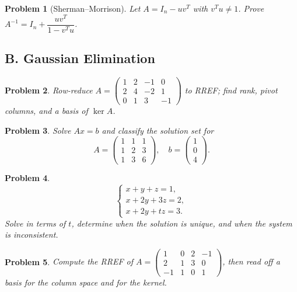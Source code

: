 \documentclass[11pt]{article}
\theoremstyle{upright}
\newtheorem{problem}{Problem}
\begin{document}
\begin{problem}[Sherman--Morrison]
Let $A=I_n-uv^T$ with $v^Tu\neq 1$. Prove $A^{-1}=I_n+\dfrac{uv^T}{1-v^Tu}$.
\end{problem}

\subsection*{B. Gaussian Elimination}
\begin{problem}
Row-reduce $A=\begin{pmatrix}1&2&-1&0\\ 2&4&-2&1\\ 0&1&3&-1\end{pmatrix}$ to RREF; find rank, pivot columns, and a basis of $\ker A$.
\end{problem}

\begin{problem}
Solve $Ax=b$ and classify the solution set for
\[
A=\begin{pmatrix}1&1&1\\ 1&2&3\\ 1&3&6\end{pmatrix},\quad
b=\begin{pmatrix}1\\0\\4\end{pmatrix}.
\]
\end{problem}

\begin{problem}
\[
\begin{cases}
x+y+z=1,\\
x+2y+3z=2,\\
x+2y+t z=3.
\end{cases}
\]
Solve in terms of $t$, determine when the solution is unique, and when the system is inconsistent.
\end{problem}

\begin{problem}
Compute the RREF of
$A=\begin{pmatrix}1&0&2&-1\\ 2&1&3&0\\ -1&1&0&1\end{pmatrix}$,
then read off a basis for the column space and for the kernel.
\end{problem}
\end{document}
